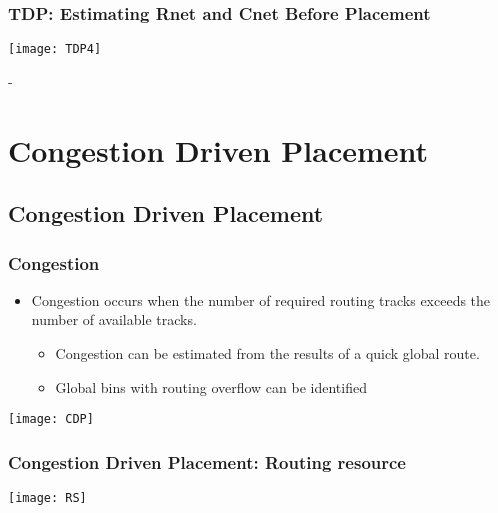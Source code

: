 \documentclass[compress]{beamer}
\begin{document}
\begin{frame}
	\frametitle{TDP: Estimating Rnet and Cnet Before Placement}
	\begin{center}
		\texttt{[image: TDP4]}
	\end{center}
\end{frame}

-
\section[Congestion]{Congestion Driven Placement}
\subsection[Congestion]{Congestion Driven Placement}
\begin{frame}
	\frametitle{Congestion}
	\begin{itemize}
		\item Congestion occurs when the number of required
		routing tracks exceeds the number of available tracks.
		\begin{itemize}
			\item Congestion can be estimated from
			the results of a quick global route.
			\item Global bins with routing overflow
			can be identified
		\end{itemize}
	\end{itemize}
\begin{center}
	\texttt{[image: CDP]}
\end{center}
\end{frame}

\begin{frame}
	\frametitle{Congestion Driven Placement: Routing resource}
		\begin{center}
			\texttt{[image: RS]}
		\end{center}
\end{frame}
\end{document}
